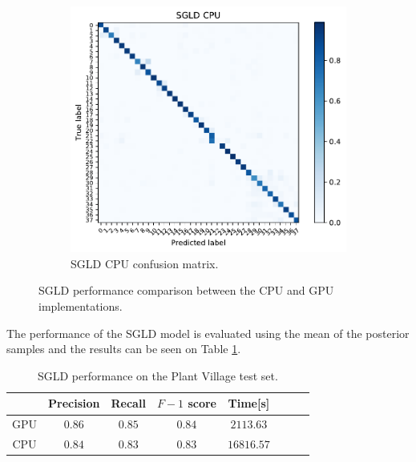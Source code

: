 \documentclass[conference]{IEEEtran}
\begin{document}
\begin{figure}
\begin{subfigure}[b]{0.5\textwidth}
		\includegraphics[width=\textwidth]{results/plants_confusion_matrix_sgld_cpu}
		\caption{SGLD CPU confusion matrix.}
		\label{fig:sgld_cpu_performance}
	\end{subfigure}
	\caption{SGLD performance comparison between the CPU and GPU implementations.}
\end{figure}

The performance of the SGLD model is evaluated using the mean of the posterior samples and the results can be seen on Table \ref{tab:performance}.


\begin{table}[h]
	\centering
	\begin{tabular}{|c|c|c|c|c|c|c|c|}
		\hline 
		& Precision & Recall & $F-1$ score & Time[s] \\ 
		\hline 
		GPU	 & $0.86$ & $0.85$ & $0.84$ & $2113.63$ \\ 
		\hline 
		CPU	 & $0.84$ & $0.83$ & $0.83$ & $16816.57$ \\ 
		\hline 
	\end{tabular}
	\caption{SGLD performance on the Plant Village test set.}
	\label{tab:performance} 
\end{table}

\clearpage
\end{document}
